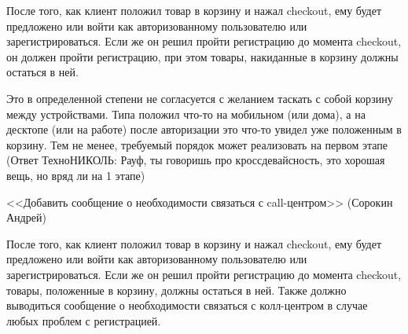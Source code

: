 {


\begin{wiki}
После того, как клиент положил товар в корзину и нажал checkout, ему будет предложено или войти как авторизованному пользователю или зарегистрироваться. Если же он решил пройти регистрацию до момента checkout, он должен пройти регистрацию, при этом товары, накиданные в корзину должны остаться в ней. 
\end{wiki}

\begin{teamidea}
Это в определенной степени не согласуется с желанием таскать с собой корзину между устройствами. Типа положил что-то на мобильном (или дома), а на десктопе (или на работе) после авторизации это что-то увидел уже положенным в корзину. Тем не менее, требуемый порядок может реализовать на первом этапе
(Ответ ТехноНИКОЛЬ: Рауф, ты говоришь про кроссдевайсность, это хорошая вещь, но вряд ли на 1 этапе)
\end{teamidea}

\begin{tn}
<<Добавить сообщение о необходимости связаться с call-центром>> 
(Сорокин Андрей)
\end{tn}


\begin{itogo}
После того, как клиент положил товар в корзину и нажал checkout, ему будет предложено или войти как авторизованному пользователю или зарегистрироваться. Если же он решил пройти регистрацию до момента checkout, товары, положенные в корзину, должны остаться в ней. Также должно выводиться сообщение о необходимости связаться с колл-центром в случае любых проблем с регистрацией. 
\end{itogo}


}


